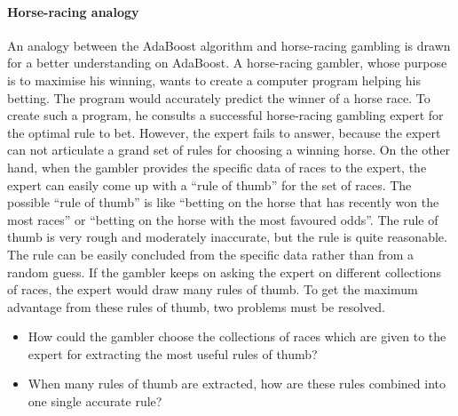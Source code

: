 \paragraph{Horse-racing analogy}
An analogy \cite{Freund1995,Freund1999,Schapire1999} between the AdaBoost algorithm and horse-racing gambling is drawn for a better understanding on AdaBoost. A horse-racing gambler, whose purpose is to maximise his winning, wants to create a computer program helping his betting. The program would accurately predict the winner of a horse race. To create such a program, he consults a successful horse-racing gambling expert for the optimal rule to bet. However, the expert fails to answer, because the expert can not articulate a grand set of rules for choosing a winning horse. On the other hand, when the gambler provides the specific data of races to the expert, the expert can easily come up with a ``rule of thumb'' for the set of races. The possible ``rule of thumb'' is like ``betting on the horse that has recently won the most races'' or ``betting on the horse with the most favoured odds''. The rule of thumb is very rough and moderately inaccurate, but the rule is quite reasonable. The rule can be easily concluded from the specific data rather than from a random guess. If the gambler keeps on asking the expert on different collections of races, the expert would draw many rules of thumb. To get the maximum advantage from these rules of thumb, two problems must be resolved.
\begin{itemize}
 \item How could the gambler choose the collections of races which are given to the expert for extracting the most useful rules of thumb?
 \item  When many rules of thumb are extracted, how are these rules combined into one single accurate rule?
\end{itemize}

